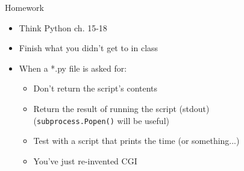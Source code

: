 \documentclass{beamer}
\begin{document}
\begin{frame}[fragile]{Homework}

\begin{itemize}
  \item Think Python ch. 15-18
  \item Finish what you didn't get to in class
  \item When a *.py file is asked for: 
    \begin{itemize}
      \item Don't return the script's contents
      \item Return the result of running the script (stdout)\\
            (\verb|subprocess.Popen()| will be useful)
      \item Test with a script that prints the time (or something...)
      \item You've just re-invented CGI
    \end{itemize}
\end{itemize}
\end{frame}
\end{document}
